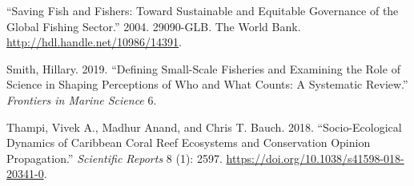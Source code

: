 \documentclass[
]{article}
\newlength{\cslhangindent}
\newlength{\cslentryspacingunit} %
\newenvironment{CSLReferences}[2] %
 {%
  \setlength{\parindent}{0pt}
  \ifodd #1
  \let\oldpar\par
  \def\par{\hangindent=\cslhangindent\oldpar}
  \fi
  \setlength{\parskip}{#2\cslentryspacingunit}
 }%
 {}
\begin{document}
\begin{CSLReferences}{1}{0}
\leavevmode{}%
{``Saving {Fish} and {Fishers}: {Toward} {Sustainable} and {Equitable} {Governance} of the {Global} {Fishing} {Sector}.''} 2004. 29090-GLB. The World Bank. \url{http://hdl.handle.net/10986/14391}.

\leavevmode{}%
Smith, Hillary. 2019. {``Defining {Small}-{Scale} {Fisheries} and {Examining} the {Role} of {Science} in {Shaping} {Perceptions} of {Who} and {What} {Counts}: {A} {Systematic} {Review}.''} \emph{Frontiers in Marine Science} 6.

\leavevmode{}%
Thampi, Vivek A., Madhur Anand, and Chris T. Bauch. 2018. {``Socio-Ecological Dynamics of {Caribbean} Coral Reef Ecosystems and Conservation Opinion Propagation.''} \emph{Scientific Reports} 8 (1): 2597. \url{https://doi.org/10.1038/s41598-018-20341-0}.

\end{CSLReferences}
\end{document}
